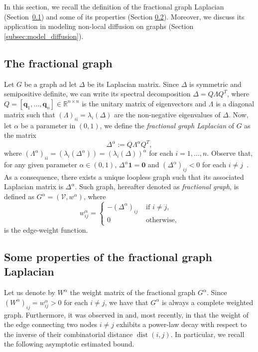 \documentclass[a4paper,12pt]{article}
\DeclareMathOperator{\dist}{dist}
\newcommand{\R}{\mathbb{R}}
\newcommand{\cV}{\mathcal{V}}
\newcommand{\onevec}{\mathbf{1}}
\newcommand{\zerovec}{\mathbf{0}}
\newcommand{\fL}{\Delta^\alpha}
\newcommand{\fW}{W^\alpha}
\newcommand{\fG}{G^\alpha}
\begin{document}
In this section, we recall the definition of the fractional graph Laplacian (Section~\ref{subsec:fractional_graph}) and some of its properties (Section \ref{subsec:properties_fL}). Moreover, we discuss its application in modeling non-local diffusion on graphs (Section \ref{subsec:model_diffusion}).


\subsection{The fractional graph}\label{subsec:fractional_graph}
Let $G$ be a graph ad let $\Delta$ be its Laplacian matrix. Since $\Delta$ is symmetric and semipositive definite, we can write its spectral decomposition $\Delta=Q \Lambda Q^T$, where $Q=[\mathbf{q}_1,\dots,\mathbf{q}_n]\in\R^{n\times n}$ is the unitary matrix of eigenvectors and $\Lambda$ is a diagonal matrix such that $(\Lambda)_{ii}=\lambda_i(\Delta)$ are the non-negative eigenvalues of $\Delta$.
Now, let $\alpha$ be a parameter in $(0,1)$, we define the \emph{fractional graph Laplacian} of $G$ as the matrix
\begin{equation*} 
    \fL := Q \Lambda^{\alpha} Q^T, 
\end{equation*}
where $(\Lambda^{\alpha})_{ii}=(\lambda_i(\fL))=(\lambda_i(\Delta))^\alpha$ for each $i=1,\dots,n$. Observe that, for any given parameter $\alpha\in(0,1)$, $\fL\onevec = \zerovec$ and $(\fL)_{ij} <0$ for each $i\neq j$~\cite{Riascos_introduction_of_fractional_laplacian}. As a consequence, there exists a unique loopless graph such that its associated Laplacian matrix is $\fL$. Such graph, hereafter denoted as \emph{fractional graph}, is defined as $G^\alpha=(\cV,w^{\alpha})$, where
\begin{equation*}
 w^{\alpha}_{ij}=
 \begin{cases}
     -(\fL)_{ij} & \text{ if } i\neq j,\\
     0 & \text{ otherwise,}
 \end{cases}
\end{equation*}
is the edge-weight function.
 
\subsection{Some properties of the fractional graph Laplacian}\label{subsec:properties_fL}

Let us denote by $\fW$ the weight matrix of the fractional graph $\fG$. Since $(\fW)_{ij}=w^{\alpha}_{ij}>0$ for each $i\neq j$, we have that $\fG$ is always a complete weighted graph. Furthermore, it was observed in \cite{Benzi_2020_fractional_laplacian,Bianchi2022} and, most recently, in \cite{Schweitzer_2022_decay_bounds_fL} that the weight of the edge connecting two nodes $i\neq j$ exhibits a power-law decay with respect to the inverse of their combinatorial distance $\dist(i,j)$. In particular, we recall the following asymptotic estimated bound.
\end{document}
